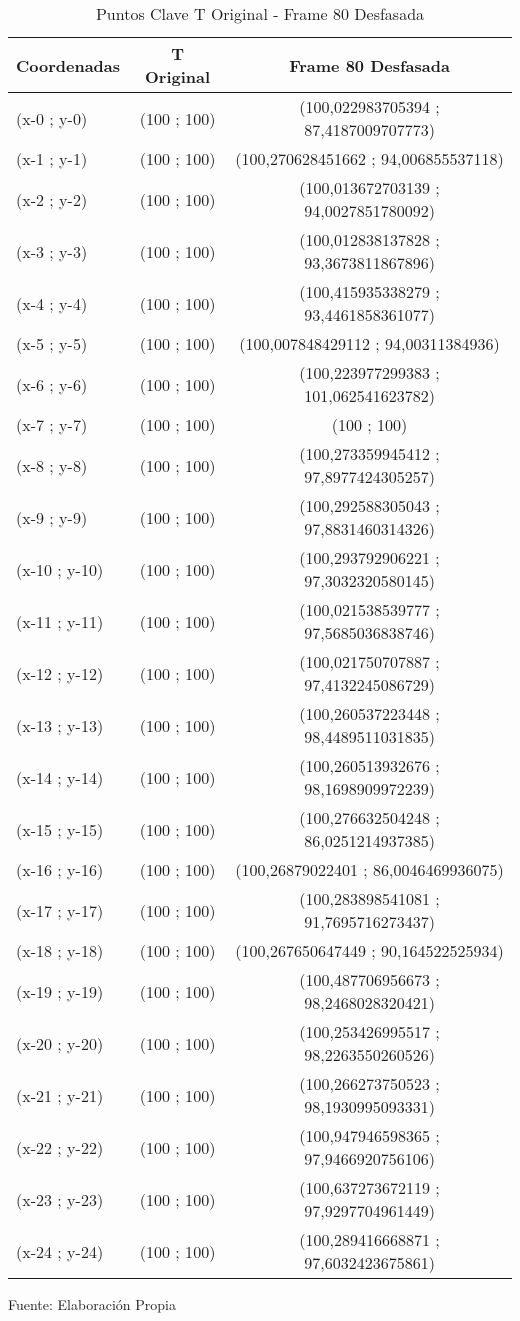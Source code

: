 \begin{table}[htbp]
	\centering
	\begin{tabular}{|l|c|c|}
		\hline
		Coordenadas & T Original & Frame 80  Desfasada \\ \hline
		(x-0 ; y-0) & (100 ; 100) & (100,022983705394 ; 87,4187009707773) \\
		(x-1 ; y-1) & (100 ; 100) & (100,270628451662 ; 94,006855537118) \\
		(x-2 ; y-2) & (100 ; 100) & (100,013672703139 ; 94,0027851780092) \\
		(x-3 ; y-3) & (100 ; 100) & (100,012838137828 ; 93,3673811867896) \\
		(x-4 ; y-4) & (100 ; 100) & (100,415935338279 ; 93,4461858361077) \\
		(x-5 ; y-5) & (100 ; 100) & (100,007848429112 ; 94,00311384936) \\
		(x-6 ; y-6) & (100 ; 100) & (100,223977299383 ; 101,062541623782) \\
		(x-7 ; y-7) & (100 ; 100) & (100 ; 100) \\
		(x-8 ; y-8) & (100 ; 100) & (100,273359945412 ; 97,8977424305257) \\
		(x-9 ; y-9) & (100 ; 100) & (100,292588305043 ; 97,8831460314326) \\
		(x-10 ; y-10) & (100 ; 100) & (100,293792906221 ; 97,3032320580145) \\
		(x-11 ; y-11) & (100 ; 100) & (100,021538539777 ; 97,5685036838746) \\
		(x-12 ; y-12) & (100 ; 100) & (100,021750707887 ; 97,4132245086729) \\
		(x-13 ; y-13) & (100 ; 100) & (100,260537223448 ; 98,4489511031835) \\
		(x-14 ; y-14) & (100 ; 100) & (100,260513932676 ; 98,1698909972239) \\
		(x-15 ; y-15) & (100 ; 100) & (100,276632504248 ; 86,0251214937385) \\
		(x-16 ; y-16) & (100 ; 100) & (100,26879022401 ; 86,0046469936075) \\
		(x-17 ; y-17) & (100 ; 100) & (100,283898541081 ; 91,7695716273437) \\
		(x-18 ; y-18) & (100 ; 100) & (100,267650647449 ; 90,164522525934) \\
		(x-19 ; y-19) & (100 ; 100) & (100,487706956673 ; 98,2468028320421) \\
		(x-20 ; y-20) & (100 ; 100) & (100,253426995517 ; 98,2263550260526) \\
		(x-21 ; y-21) & (100 ; 100) & (100,266273750523 ; 98,1930995093331) \\
		(x-22 ; y-22) & (100 ; 100) & (100,947946598365 ; 97,9466920756106) \\
		(x-23 ; y-23) & (100 ; 100) & (100,637273672119 ; 97,9297704961449) \\
		(x-24 ; y-24) & (100 ; 100) & (100,289416668871 ; 97,6032423675861) \\ \hline
	\end{tabular}%
	\caption{Puntos Clave T Original - Frame 80  Desfasada}
	\footnotesize Fuente: Elaboración Propia
	\label{checkerporcentage1}
\end{table}%


